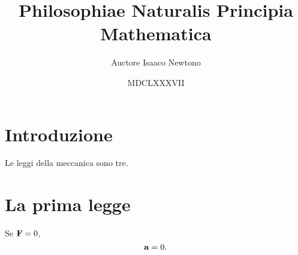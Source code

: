 \documentclass{article}
\title{Philosophiae Naturalis Principia Mathematica}
\author{Auctore Isaaco Newtono}
\date{MDCLXXXVII}
\begin{document}
\maketitle

\section{Introduzione}
Le leggi della meccanica sono tre.

\section{La prima legge}
Se $\vb F = 0$,
\begin{equation}
	\vb a = 0.
\end{equation}
\end{document}
